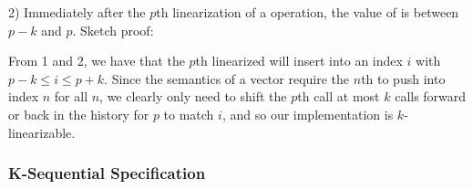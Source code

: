 \documentclass{sigplanconf}
\begin{document}
2) Immediately after the $p$th linearization of a  operation, the value of  is between $p-k$ and $p$. Sketch proof: 

From 1 and 2, we have that the $p$th linearized  will insert into an index $i$ with $p - k \le i \le p + k$. Since the semantics of a vector require the $n$th  to push into index $n$ for all $n$, we clearly only need to shift the $p$th call at most $k$ calls forward or back in the history for $p$ to match $i$, and so our implementation is $k$-linearizable.

\subsubsection{K-Sequential Specification}

% 
% 
% 
% 
% 
% 
% 
% 
% 
\end{document}
